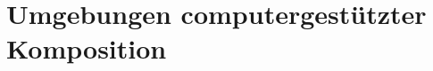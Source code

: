 \documentclass[12pt,a4paper,ngerman]{article}
\begin{document}
%


\section{Umgebungen computergestützter Komposition}

% 
\end{document}
